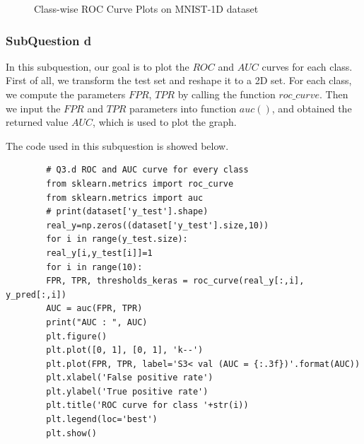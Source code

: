 \documentclass[conference]{IEEEtran}
\begin{document}
\begin{figure}[t]
		
		\caption{Class-wise ROC Curve Plots on MNIST-1D dataset}
		\label{Fig.ba}
	\end{figure}
	\subsubsection{SubQuestion d}
	In this subquestion, our goal is to plot the $ROC$ and $AUC$ curves for each class. First of all, we transform the test set and reshape it to a 2D set. For each class, we compute the parameters $FPR$, $TPR$ by calling the function $roc\_curve$. Then we input the $FPR$ and $TPR$ parameters into function $auc()$, and obtained the returned value $AUC$, which is used to plot the graph.\par
	The code used in this subquestion is showed below.
	\begin{lstlisting}
		# Q3.d ROC and AUC curve for every class
		from sklearn.metrics import roc_curve
		from sklearn.metrics import auc
		# print(dataset['y_test'].shape)
		real_y=np.zeros((dataset['y_test'].size,10))
		for i in range(y_test.size):
		real_y[i,y_test[i]]=1
		for i in range(10):
		FPR, TPR, thresholds_keras = roc_curve(real_y[:,i], y_pred[:,i])   
		AUC = auc(FPR, TPR)
		print("AUC : ", AUC)
		plt.figure()
		plt.plot([0, 1], [0, 1], 'k--')
		plt.plot(FPR, TPR, label='S3< val (AUC = {:.3f})'.format(AUC))
		plt.xlabel('False positive rate')
		plt.ylabel('True positive rate')
		plt.title('ROC curve for class '+str(i))
		plt.legend(loc='best')
		plt.show()   
	\end{lstlisting}
	
\end{document}
